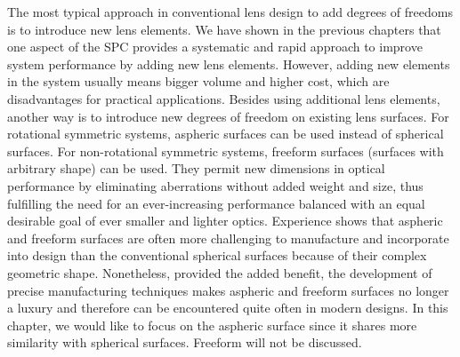 The most typical approach in conventional lens design to add degrees of freedoms is to introduce new lens elements. We have shown in the previous chapters that one aspect of the SPC provides a systematic and rapid approach to improve system performance by adding new lens elements. However, adding new elements in the system usually means bigger volume and higher cost, which are disadvantages for practical applications. 
Besides using additional lens elements, another way is to introduce new degrees of freedom on existing lens surfaces. For rotational symmetric systems, aspheric surfaces can be used instead of spherical surfaces. For non-rotational symmetric systems, freeform surfaces (surfaces with arbitrary shape) can be used. They permit new dimensions in optical performance by eliminating aberrations without added weight and size, thus fulfilling the need for an ever-increasing performance balanced with an equal desirable goal of ever smaller and lighter optics. Experience shows that aspheric and freeform surfaces are often more challenging to manufacture and incorporate into design than the conventional spherical surfaces because of their complex geometric shape. Nonetheless, provided the added benefit, the development of precise manufacturing techniques makes aspheric and freeform surfaces no longer a luxury and therefore can be encountered quite often in modern designs. In this chapter, we would like to focus on the aspheric surface since it shares more similarity with spherical surfaces. Freeform will not be discussed. 


